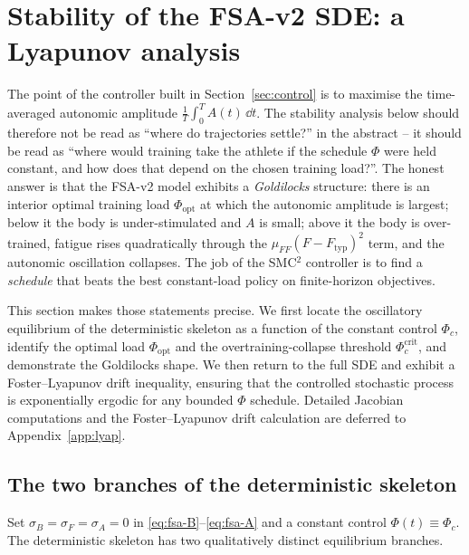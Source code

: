 \section{Stability of the FSA-v2 SDE: a Lyapunov analysis}\label{sec:lyap}

The point of the controller built in Section~\ref{sec:control} is to
maximise the time-averaged autonomic amplitude
$\frac{1}{T}\int_0^T A(t)\,\dd t$. The stability analysis below
should therefore not be read as ``where do trajectories settle?'' in
the abstract -- it should be read as ``where would training take
the athlete if the schedule $\Phi$ were held constant, and how does
that depend on the chosen training load?''. The honest answer is
that the FSA-v2 model exhibits a \emph{Goldilocks} structure: there
is an interior optimal training load $\Phi_{\mathrm{opt}}$ at which
the autonomic amplitude is largest; below it the body is
under-stimulated and $A$ is small; above it the body is
over-trained, fatigue rises quadratically through the
$\mu_{FF}(F-F_{\mathrm{typ}})^2$ term, and the autonomic oscillation
collapses. The job of the SMC${}^2$ controller is to find a
\emph{schedule} that beats the best constant-load policy on
finite-horizon objectives.

This section makes those statements precise. We first locate the
oscillatory equilibrium of the deterministic skeleton as a function
of the constant control $\Phi_c$, identify the optimal load
$\Phi_{\mathrm{opt}}$ and the overtraining-collapse threshold
$\Phi_c^{\mathrm{crit}}$, and demonstrate the Goldilocks shape. We
then return to the full SDE and exhibit a Foster--Lyapunov drift
inequality, ensuring that the controlled stochastic process is
exponentially ergodic for any bounded $\Phi$ schedule. Detailed
Jacobian computations and the Foster--Lyapunov drift calculation
are deferred to Appendix~\ref{app:lyap}.

\subsection{The two branches of the deterministic skeleton}\label{sec:lyap-branches}

Set $\sigma_B = \sigma_F = \sigma_A = 0$ in
\eqref{eq:fsa-B}--\eqref{eq:fsa-A} and a constant control
$\Phi(t) \equiv \Phi_c$. The deterministic skeleton has two
qualitatively distinct equilibrium branches.

